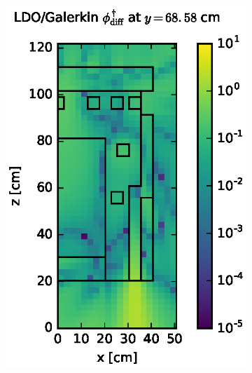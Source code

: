 \begin{figure}[!htb]
\begin{subfigure}{0.4\textwidth}
\includegraphics[max height=0.445\textheight]
{img/dlvn-plots/fwc-adj/flux-diff-rel-gkn04.eps}
\label{dlvn-fwc-gkn-ldo}
\end{subfigure}
\\
\begin{subfigure}{0.4\textwidth}

\end{subfigure}
\end{figure}

